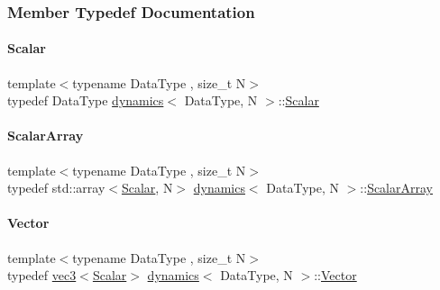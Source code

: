 \subsubsection{Member Typedef Documentation}
\mbox{\label{classdynamics_a444c7534e86115117798563cb0e43cde}} 
\paragraph{\texorpdfstring{Scalar}{Scalar}}
{\footnotesize\ttfamily template$<$typename Data\+Type , size\+\_\+t N$>$ \\
typedef Data\+Type \mbox{\hyperlink{classdynamics}{dynamics}}$<$ Data\+Type, N $>$\+::\mbox{\hyperlink{classdynamics_a444c7534e86115117798563cb0e43cde}{Scalar}}}

\mbox{\label{classdynamics_ac31f831ea1577092662dafd2daba0f48}} 
\paragraph{\texorpdfstring{Scalar\+Array}{ScalarArray}}
{\footnotesize\ttfamily template$<$typename Data\+Type , size\+\_\+t N$>$ \\
typedef std\+::array$<$\mbox{\hyperlink{classdynamics_a444c7534e86115117798563cb0e43cde}{Scalar}}, N$>$ \mbox{\hyperlink{classdynamics}{dynamics}}$<$ Data\+Type, N $>$\+::\mbox{\hyperlink{classdynamics_ac31f831ea1577092662dafd2daba0f48}{Scalar\+Array}}}

\mbox{\label{classdynamics_a9ba7c016128ac3a2eb51f7bcfbf90243}} 
\paragraph{\texorpdfstring{Vector}{Vector}}
{\footnotesize\ttfamily template$<$typename Data\+Type , size\+\_\+t N$>$ \\
typedef \mbox{\hyperlink{structvec3}{vec3}}$<$\mbox{\hyperlink{classdynamics_a444c7534e86115117798563cb0e43cde}{Scalar}}$>$ \mbox{\hyperlink{classdynamics}{dynamics}}$<$ Data\+Type, N $>$\+::\mbox{\hyperlink{classdynamics_a9ba7c016128ac3a2eb51f7bcfbf90243}{Vector}}}

